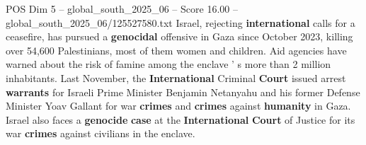 \begin{textsample}{POS Dim 5 – global\_south\_2025\_06 – Score 16.00 – global\_south\_2025\_06/125527580.txt}
Israel, rejecting \textbf{international} calls for a ceasefire, has pursued a \textbf{genocidal} offensive in Gaza since October 2023, killing over 54,600 Palestinians, most of them women and children.
Aid agencies have warned about the risk of famine among the enclave ' s more than 2 million inhabitants.
Last November, the \textbf{International} Criminal \textbf{Court} issued arrest \textbf{warrants} for Israeli Prime Minister Benjamin Netanyahu and his former Defense Minister Yoav Gallant for war \textbf{crimes} and \textbf{crimes} against \textbf{humanity} in Gaza.
Israel also faces a \textbf{genocide} \textbf{case} at the \textbf{International} \textbf{Court} of Justice for its war \textbf{crimes} against civilians in the enclave.

\end{textsample}
